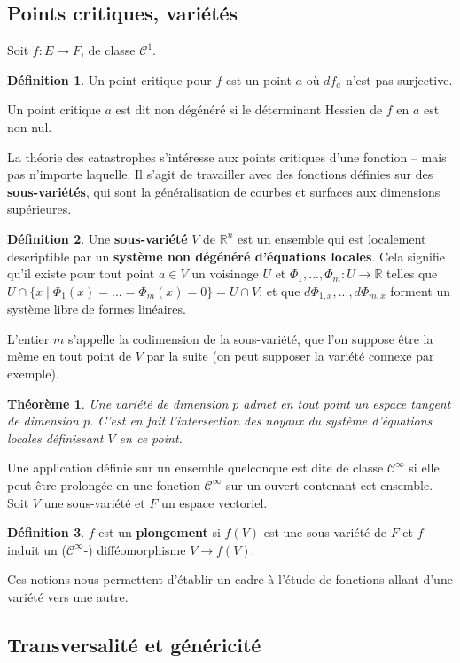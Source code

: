 \documentclass[a4paper]{article}
\newcommand{\cun}{\mathcal{C}^1}
\newcommand{\cinf}{\mathcal{C}^\infty}
\newcommand{\R}{\mathbb{R}}
\newtheorem{thm}{Théorème}
\theoremstyle{definition}
\newtheorem{defn}{Définition}
\begin{document}
\subsection{Points critiques, variétés}

Soit $f:E\to F$, de classe $\cun$.
\begin{defn}
	Un point critique pour $f$ est un point $a$ où $df_a$ n'est pas surjective.

	Un point critique $a$ est dit non dégénéré si le déterminant Hessien de $f$ en $a$ est non nul.
\end{defn}

La théorie des catastrophes s'intéresse aux points critiques d'une fonction -- mais pas n'importe laquelle.
Il s'agit de travailler avec des fonctions définies sur des \textbf{sous-variétés}, qui sont la généralisation de courbes et surfaces aux dimensions supérieures.
\begin{defn}
	Une \textbf{sous-variété} $V$ de $\R^n$ est un ensemble qui est localement descriptible par un \textbf{système non dégénéré d'équations locales}.
	Cela signifie qu'il existe pour tout point $a\in V$ un voisinage $U$ et $\Phi_1,...,\Phi_m: U \to\R$ telles que $U\cap\{x\mid \Phi_1(x)=...=\Phi_m(x)=0\}=U\cap V$; et que $d\Phi_{1,x},...,d\Phi_{m,x}$ forment un système libre de formes linéaires.

	L'entier $m$ s'appelle la codimension de la sous-variété, que l'on suppose être la même en tout point de $V$ par la suite (on peut supposer la variété connexe par exemple).
\end{defn}
\begin{thm}
	Une variété de dimension $p$ admet en tout point un espace tangent de dimension $p$.
	C'est en fait l'intersection des noyaux du système d'équations locales définissant $V$ en ce point.
\end{thm}

Une application définie sur un ensemble quelconque est dite de classe $\cinf$ si elle peut être prolongée en une fonction $\cinf$ sur un ouvert contenant cet ensemble. Soit $V$ une sous-variété et $F$ un espace vectoriel.
\begin{defn}
	$f$ est un \textbf{plongement} si $f(V)$ est une sous-variété de $F$ et $f$ induit un ($\cinf$-) difféomorphisme $V\to f(V)$.
\end{defn}

Ces notions nous permettent d'établir un cadre à l'étude de fonctions allant d'une variété vers une autre.

\subsection{Transversalité et généricité}
\end{document}

